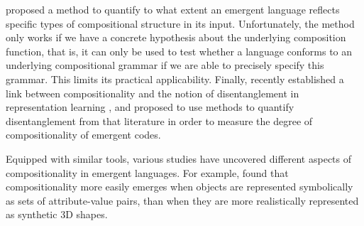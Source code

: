 proposed a method to quantify to what extent an emergent language reflects specific types of compositional structure in its
input. Unfortunately, the method only works if we have a concrete
hypothesis about the underlying composition function, that is, it can only be used to test whether a language conforms to an underlying compositional grammar if we are able to precisely specify this grammar. This limits its practical
applicability. Finally,  recently established a link between compositionality and the notion of disentanglement in representation learning \cite{Suter:etal:2019}, and proposed to use methods to quantify disentanglement from that literature in order to measure the degree of compositionality of emergent codes.

Equipped with similar tools, various studies have uncovered different aspects
of compositionality in emergent languages. For example, 
found that compositionality more easily emerges when objects are
represented symbolically as sets of attribute-value pairs, than when
they are more realistically represented as synthetic 3D shapes. %
%
